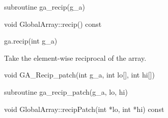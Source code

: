 \documentclass[10pt]{article}
\begin{document}
\begin{fapi}
\begin{fcode}
subroutine ga_recip(g_a)
\end{fcode}
\begin{funcargs}
\end{funcargs}
\end{fapi}

\begin{cxxapi}
\begin{cxxcode}
void GlobalArray::recip() const
\end{cxxcode}
\end{cxxapi}

\begin{pyapi}
\begin{pycode}
ga.recip(int g_a)
\end{pycode}
\begin{funcargs}
\end{funcargs}
\end{pyapi}

\gcoll

\begin{desc}
Take the element-wise reciprocal of the array.
\end{desc}


\begin{capi}
\begin{ccode}
void GA_Recip_patch(int g_a, int lo[], int hi[])
\end{ccode}
\begin{funcargs}
\end{funcargs}
\end{capi}

\begin{fapi}
\begin{fcode}
subroutine ga_recip_patch(g_a, lo, hi)
\end{fcode}
\begin{funcargs}
\end{funcargs}
\end{fapi}

\begin{cxxapi}
\begin{cxxcode}
void GlobalArray::recipPatch(int *lo, int *hi) const
\end{cxxcode}
\begin{funcargs}
\end{funcargs}
\end{cxxapi}
\end{document}
